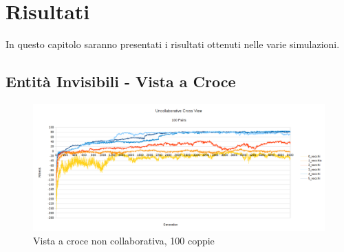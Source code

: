 \chapter{Risultati}
In questo capitolo saranno presentati i risultati ottenuti nelle varie
simulazioni.

\section{Entità Invisibili - Vista a Croce}

\begin{figure}[ht]
	\centering
	\includegraphics[scale=0.7,angle=90]{imgs/uncollaborative_cross_100_pairs_0_5_vecchi.png}
	\caption{Vista a croce non collaborativa, 100 coppie}
	\label{figure:patient_2_main}
\end{figure}
